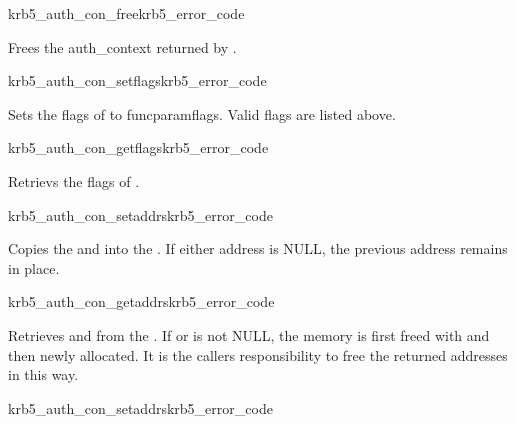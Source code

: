\begin{funcdecl}{krb5_auth_con_free}{krb5_error_code}{\funcinout}
\end{funcdecl}

Frees the auth_context  returned by
.

\begin{funcdecl}{krb5_auth_con_setflags}{krb5_error_code}{\funcinout}
\funcin
{}
\end{funcdecl}

Sets the flags of  to funcparam{flags}. Valid
flags are listed above.


\begin{funcdecl}{krb5_auth_con_getflags}{krb5_error_code}{\funcinout}
\funcin
{}
\funcout
{}
\end{funcdecl}

Retrievs the flags of .

\begin{funcdecl}{krb5_auth_con_setaddrs}{krb5_error_code}{\funcinout}
\funcin
{}
\end{funcdecl}

Copies the  and  into the
. If either address is NULL, the previous
address remains in place.

\begin{funcdecl}{krb5_auth_con_getaddrs}{krb5_error_code}{\funcinout}
\funcout
{}
\end{funcdecl}

Retrieves   and  from the
. If  or
 is not NULL, the memory is first freed with
 and then newly allocated. It is the callers
responsibility to free the returned addresses in this way.


\begin{funcdecl}{krb5_auth_con_setaddrs}{krb5_error_code}{\funcinout}
\funcin
{}
\end{funcdecl}

